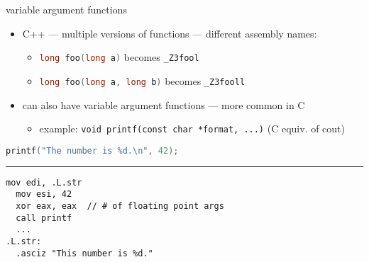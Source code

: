 \begin{frame}[fragile,label=varArgFunc]{variable argument functions}
\begin{itemize}
\item C++ --- multiple versions of functions --- different assembly names:
\begin{itemize}
\item \lstinline[language=C++]|long foo(long a)| becomes \texttt{\_Z3fool}
\item \lstinline[language=C++]|long foo(long a, long b)| becomes \texttt{\_Z3fooll}
\end{itemize}
\item can also have variable argument functions --- more common in C
\begin{itemize}
\item example: \lstinline|void printf(const char *format, ...)| (C equiv. of cout)
\end{itemize}
\end{itemize}
\begin{lstlisting}[language=C++]
printf("The number is %d.\n", 42);
\end{lstlisting}
\hrule
\begin{lstlisting}[language=myasm]
  mov edi, .L.str
  mov esi, 42
  xor eax, eax  // # of floating point args
  call printf
  ...
.L.str:
  .asciz "This number is %d."
\end{lstlisting}
\end{frame}
